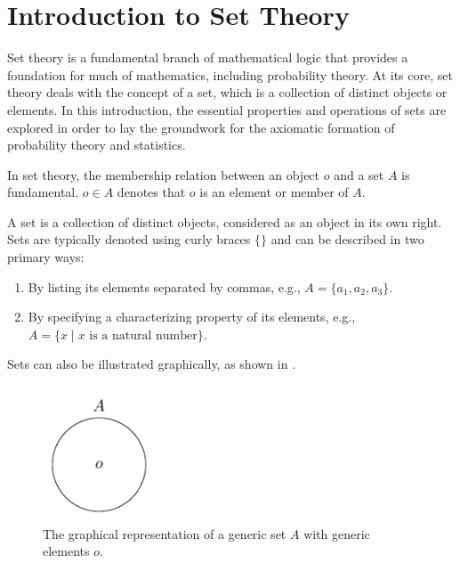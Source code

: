 \chapter{Introduction to Set Theory}
\label{chp:set_theory}
Set theory is a fundamental branch of mathematical logic that provides a foundation for much of mathematics, including probability theory. At its core, set theory deals with the concept of a set, which is a collection of distinct objects or elements. In this introduction, the essential properties and operations of sets are explored in order to lay the groundwork for the axiomatic formation of probability theory and statistics.


\begin{definition}[Membership]
	In set theory, the membership relation between an object $o$ and a set $A$ is fundamental. $o \in A$ denotes that $o$ is an element or member of $A$.
\end{definition}

\begin{definition}[Set]
	A set is a collection of distinct objects, considered as an object in its own right. Sets are typically denoted using curly braces $\{\}$ and can be described in two primary ways:
	\begin{enumerate}
		\item By listing its elements separated by commas, e.g., $A = \{a_1, a_2, a_3\}$.
		\item By specifying a characterizing property of its elements, e.g., \newline $A = \{x \mid x \text{ is a natural number}\}$.
	\end{enumerate}
	Sets can also be illustrated graphically, as shown in .
	\begin{figure}[H]
		\centering
		\includegraphics[width = 0.3\textwidth]{figures/generic_set.pdf}
		\caption{The graphical representation of a generic set $A$ with generic elements $o$.}
		\label{fig:generic_set}
	\end{figure}
\end{definition}


